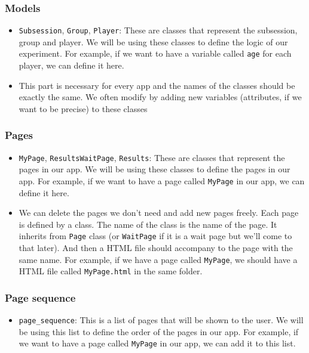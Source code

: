 \documentclass[
  letterpaper,
  DIV=11,
  numbers=noendperiod]{scrreprt}
\providecommand{\tightlist}{%
  \setlength{\itemsep}{0pt}\setlength{\parskip}{0pt}}\usepackage{longtable,booktabs,array}
\begin{document}
\hypertarget{models}{%
\subsubsection{Models}\label{models}}

\begin{itemize}
\item
  \texttt{Subsession}, \texttt{Group}, \texttt{Player}: These are
  classes that represent the subsession, group and player. We will be
  using these classes to define the logic of our experiment. For
  example, if we want to have a variable called \texttt{age} for each
  player, we can define it here.
\item
  This part is necessary for every app and the names of the classes
  should be exactly the same. We often modify by adding new variables
  (attributes, if we want to be precise) to these classes
\end{itemize}

\hypertarget{pages}{%
\subsubsection{Pages}\label{pages}}

\begin{itemize}
\item
  \texttt{MyPage}, \texttt{ResultsWaitPage}, \texttt{Results}: These are
  classes that represent the pages in our app. We will be using these
  classes to define the pages in our app. For example, if we want to
  have a page called \texttt{MyPage} in our app, we can define it here.
\item
  We can delete the pages we don't need and add new pages freely. Each
  page is defined by a class. The name of the class is the name of the
  page. It inherits from \texttt{Page} class (or \texttt{WaitPage} if it
  is a wait page but we'll come to that later). And then a HTML file
  should accompany to the page with the same name. For example, if we
  have a page called \texttt{MyPage}, we should have a HTML file called
  \texttt{MyPage.html} in the same folder.
\end{itemize}

\hypertarget{page-sequence}{%
\subsubsection{Page sequence}\label{page-sequence}}

\begin{itemize}
\tightlist
\item
  \texttt{page\_sequence}: This is a list of pages that will be shown to
  the user. We will be using this list to define the order of the pages
  in our app. For example, if we want to have a page called
  \texttt{MyPage} in our app, we can add it to this list.
\end{itemize}
\end{document}
